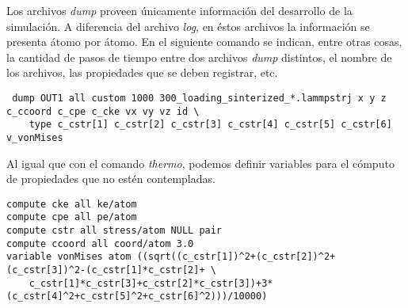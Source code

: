 Los archivos \textit{dump} proveen únicamente información del desarrollo de la simulación. A diferencia del archivo \textit{log}, en éstos archivos la información se presenta átomo por átomo. En el siguiente comando se indican, entre otras cosas, la cantidad de pasos de tiempo entre dos archivos \textit{dump} distintos, el nombre de los archivos, las propiedades que se deben registrar, etc.

\begin{lstlisting}
 dump OUT1 all custom 1000 300_loading_sinterized_*.lammpstrj x y z c_ccoord c_cpe c_cke vx vy vz id \
	type c_cstr[1] c_cstr[2] c_cstr[3] c_cstr[4] c_cstr[5] c_cstr[6] v_vonMises
\end{lstlisting}

Al igual que con el comando \textit{thermo}, podemos definir variables para el cómputo de propiedades que no estén contempladas.

\begin{lstlisting}
compute cke all ke/atom
compute cpe all pe/atom
compute cstr all stress/atom NULL pair
compute ccoord all coord/atom 3.0
variable vonMises atom ((sqrt((c_cstr[1])^2+(c_cstr[2])^2+(c_cstr[3])^2-(c_cstr[1]*c_cstr[2]+ \
	c_cstr[1]*c_cstr[3]+c_cstr[2]*c_cstr[3])+3*(c_cstr[4]^2+c_cstr[5]^2+c_cstr[6]^2)))/10000)
\end{lstlisting}